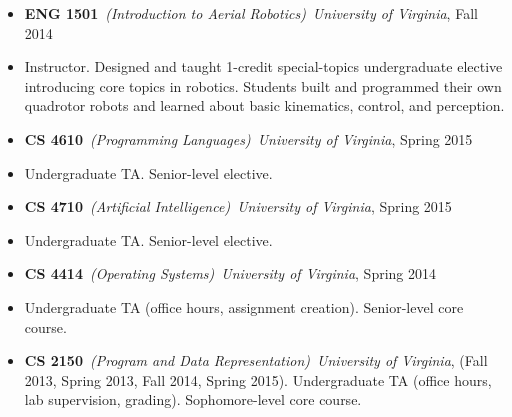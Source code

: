\documentclass[10pt]{article}
\newenvironment{class}[4]{\setlength{\parskip}{0pt}%
	\begin{itemize}[label={},leftmargin=0cm,labelindent=0pt,nolistsep]%
		\item\textbf{#1}~\emph{({#2})}~\hfill\emph{#3}, #4}{\end{itemize}\medskip}
\begin{document}
\begin{class}{ENG 1501}{Introduction to Aerial Robotics}{University of Virginia}{Fall 2014}
	\item Instructor. Designed and taught 1-credit special-topics undergraduate elective introducing
	core topics in robotics. Students built and programmed their own quadrotor robots and learned
	about basic kinematics, control, and perception.
\end{class}

\begin{class}{CS 4610}{Programming Languages}{University of Virginia}{Spring 2015}
	\item Undergraduate TA. Senior-level elective.
\end{class}

\begin{class}{CS 4710}{Artificial Intelligence}{University of Virginia}{Spring 2015}
	\item Undergraduate TA. Senior-level elective.
\end{class}

\begin{class}{CS 4414}{Operating Systems}{University of Virginia}{Spring 2014}
	\item Undergraduate TA (office hours, assignment creation). Senior-level core course.
\end{class}

\begin{class}{CS 2150}{Program and Data Representation}{University of Virginia}{(Fall 2013, Spring
		2013, Fall 2014, Spring 2015). Undergraduate TA (office hours, lab supervision, grading). Sophomore-level core course.}
\end{class}
\end{document}
